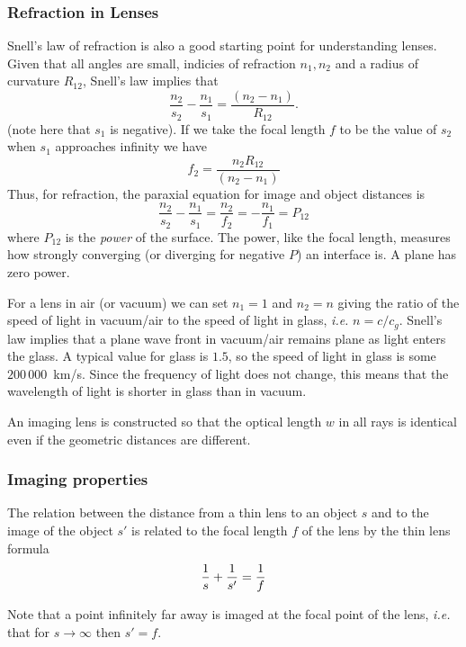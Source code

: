 \documentclass{article}
\begin{document}
\subsubsection{Refraction in Lenses}

Snell's law of refraction is also a good starting point for
understanding lenses.
Given that all angles are small, indicies of refraction $n_1,n_2$ and
a radius of curvature $R_{12}$, Snell's law implies that
\[
\frac{n_2}{s_2}-\frac{n_1}{s_1}=\frac{(n_2-n_1)}{R_{12}}.
\]
(note here that $s_1$ is negative).
If we take the focal length $f$ to be the value of $s_2$ when $s_1$
approaches infinity we have
\[
f_2=\frac{n_2R_{12}}{(n_2-n_1)}
\]
Thus, for refraction, the paraxial equation for image and object
distances is
\[
\frac{n_2}{s_2}-\frac{n_1}{s_1}=\frac{n_2}{f_2}=-\frac{n_1}{f_1}=P_{12}
\]
where $P_{12}$ is the {\it power} of the surface. The power, like the
focal length, measures how strongly converging (or diverging for
negative $P$) an interface is. A plane has zero power.

For a lens in air (or vacuum) we can set $n_1=1$ and $n_2=n$ giving the ratio of the speed of light
in vacuum/air to the speed of light in glass, {\it i.e.} $n={c/c_g}$. Snell's 
law implies that a plane wave front in vacuum/air remains plane as light 
enters the glass. A typical value for glass is $1.5$, so the speed of light 
in glass is some $200\,000$~km/s. Since the frequency of light does not change,
this means that the wavelength of light is shorter in glass than in vacuum.

An imaging lens is constructed so that the optical length $w$ in all rays is 
identical even if the geometric distances are different. 

\subsubsection{Imaging properties}

The relation between the distance from a thin lens to an object $s$ and to the 
image of the object $s'$ is related to the focal length $f$ of the lens by the 
thin lens formula
\[
{1\over s}+{1\over s'}={1\over f}
\]

Note that a point infinitely far away is imaged at the focal point of the 
lens, {\it i.e.} that for $s\rightarrow\infty$ then $s'=f$. 
\end{document}
